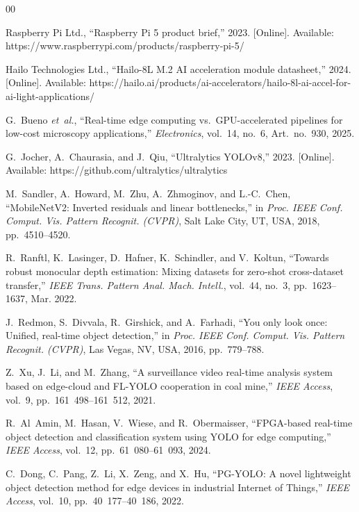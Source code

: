 \documentclass{ieeeaccess}
\begin{document}
\begin{thebibliography}{00}

 Raspberry Pi Ltd., ``Raspberry Pi 5 product brief,'' 2023. [Online]. Available: https://www.raspberrypi.com/products/raspberry-pi-5/

 Hailo Technologies Ltd., ``Hailo-8L M.2 AI acceleration module datasheet,'' 2024. [Online]. Available: https://hailo.ai/products/ai-accelerators/hailo-8l-ai-accel-for-ai-light-applications/

 G.~Bueno \emph{et~al.}, ``Real-time edge computing vs.\ GPU-accelerated pipelines for low-cost microscopy applications,'' \emph{Electronics}, vol.~14, no.~6, Art.~no.~930, 2025.

 G.~Jocher, A.~Chaurasia, and J.~Qiu, ``Ultralytics YOLOv8,'' 2023. [Online]. Available: https://github.com/ultralytics/ultralytics

 M.~Sandler, A.~Howard, M.~Zhu, A.~Zhmoginov, and L.-C.~Chen, ``MobileNetV2: Inverted residuals and linear bottlenecks,'' in \emph{Proc. IEEE Conf. Comput. Vis. Pattern Recognit. (CVPR)}, Salt Lake City, UT, USA, 2018, pp.~4510--4520.

 R.~Ranftl, K.~Lasinger, D.~Hafner, K.~Schindler, and V.~Koltun, ``Towards robust monocular depth estimation: Mixing datasets for zero-shot cross-dataset transfer,'' \emph{IEEE Trans. Pattern Anal. Mach. Intell.}, vol.~44, no.~3, pp.~1623--1637, Mar. 2022.

 J.~Redmon, S.~Divvala, R.~Girshick, and A.~Farhadi, ``You only look once: Unified, real-time object detection,'' in \emph{Proc. IEEE Conf. Comput. Vis. Pattern Recognit. (CVPR)}, Las Vegas, NV, USA, 2016, pp.~779--788.

 Z.~Xu, J.~Li, and M.~Zhang, ``A surveillance video real-time analysis system based on edge-cloud and FL-YOLO cooperation in coal mine,'' \emph{IEEE Access}, vol.~9, pp.~161~498--161~512, 2021.

 R.~Al~Amin, M.~Hasan, V.~Wiese, and R.~Obermaisser, ``FPGA-based real-time object detection and classification system using YOLO for edge computing,'' \emph{IEEE Access}, vol.~12, pp.~61~080--61~093, 2024.

 C.~Dong, C.~Pang, Z.~Li, X.~Zeng, and X.~Hu, ``PG-YOLO: A novel lightweight object detection method for edge devices in industrial Internet of Things,'' \emph{IEEE Access}, vol.~10, pp.~40~177--40~186, 2022.


\end{thebibliography}
\end{document}
